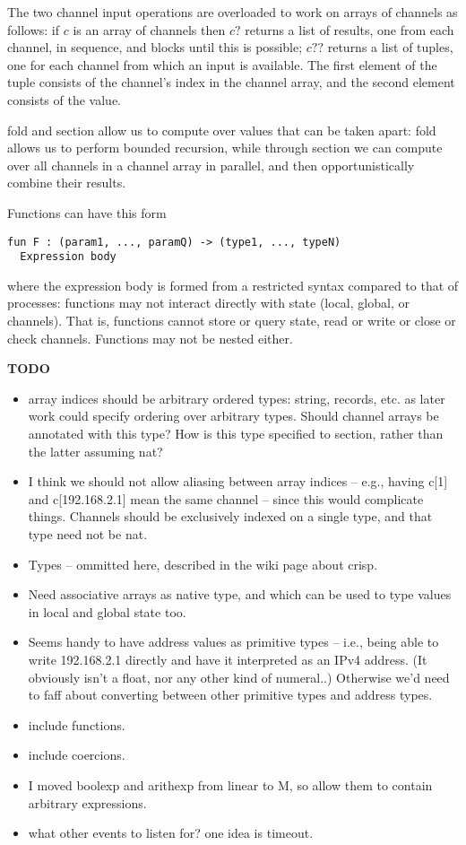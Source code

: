 \documentclass{article}
\newenvironment{todo}{\begin{mdframed}[backgroundcolor=gray!20]\bf TODO \begin{itemize}}{\end{itemize}\end{mdframed}}
\begin{document}
The two channel input operations are overloaded to work on arrays of channels as
follows: if $c$ is an array of channels then $c?$ returns a list of results, one
from each channel, in sequence, and blocks until this is possible; $c??$ returns
a list of tuples, one for each channel from which an input is available. The
first element of the tuple consists of the channel's index in the channel array,
and the second element consists of the value.

fold and section allow us to compute over values that can be taken apart:
fold allows us to perform bounded recursion, while through section we can
compute over all channels in a channel array in parallel, and then
opportunistically combine their results.

Functions can have this form
\begin{verbatim}
fun F : (param1, ..., paramQ) -> (type1, ..., typeN)
  Expression body
\end{verbatim}
where the expression body is formed from a restricted syntax compared to that of
processes: functions may not interact directly with state (local, global, or
channels). That is, functions cannot store or query state, read or write or
close or check channels. Functions may not be nested either.

\begin{todo}
\item array indices should be arbitrary ordered types: string, records, etc. as
  later work could specify ordering over arbitrary types.
  Should channel arrays be annotated with this type?
  How is this type specified to section, rather than the latter assuming nat?
\item I think we should not allow aliasing between array indices -- e.g., having
  c[1] and c[192.168.2.1] mean the same channel -- since this would complicate
  things. Channels should be exclusively indexed on a single type, and that type
  need not be nat.
\item Types -- ommitted here, described in the wiki page about crisp.
\item Need associative arrays as native type, and which can be used to type
  values in local and global state too.
\item Seems handy to have address values as primitive types -- i.e., being able
  to write 192.168.2.1 directly and have it interpreted as an IPv4 address.
  (It obviously isn't a float, nor any other kind of numeral..)
  Otherwise we'd need to faff about converting between other primitive types and
  address types.
\item include functions.
\item include coercions.
\item I moved boolexp and arithexp from linear to M, so allow them to contain
  arbitrary expressions.
\item what other events to listen for? one idea is timeout.
\end{todo}
\end{document}
